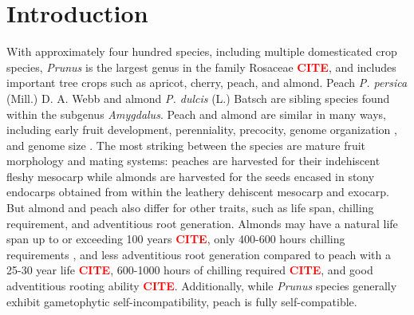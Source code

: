 \documentclass[12pt]{article}
\newcommand{\citex}{\textcolor{red}{\bf CITE}}
\begin{document}
\section*{Introduction}
%
With approximately four hundred species, including multiple domesticated crop species, \emph{Prunus} is the largest genus in the family Rosaceae \citex, and includes important tree crops such as apricot, cherry, peach, and almond.
%
Peach \emph{P. persica} (Mill.) D. A. Webb and almond \emph{P. dulcis} (L.) Batsch are sibling species found within the subgenus \emph{Amygdalus}.
%
Peach and almond are similar in many ways, including early fruit development, perenniality, precocity, genome organization \citep{arus2012peach}, and genome size \citep{arumuganathan1991nuclear, dickson1992nuclear, baird1994estimating, loureiro2007two}. 
%
The most striking between the species are mature fruit morphology and mating systems: peaches are harvested for their indehiscent fleshy mesocarp while almonds are harvested for the seeds encased in stony endocarps obtained from within the leathery dehiscent mesocarp and exocarp. 
%
But almond and peach also differ for other traits, such as life span, chilling requirement, and adventitious root generation.
%
Almonds may have a natural life span up to or exceeding 100 years \citex,
only 400-600 hours chilling requirements \citep{alonso2005determination}, 
and less adventitious root generation compared to peach with a 25-30 year life \citex, 
600-1000 hours of chilling required \citex, 
and good adventitious rooting ability \citex. 
%
Additionally, while \emph{Prunus} species generally exhibit gametophytic self-incompatibility, peach is fully self-compatible.

\end{document}
